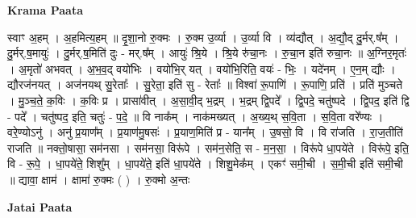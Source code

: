 \documentclass[17pt]{extarticle}
\begin{document}
\textbf{Krama Paata} \newline

स्वाꣳ अ॒हम् । अ॒हमित्य॒हम् ॥ दृ॒शा॒नो रु॒क्मः । रु॒क्म उ॒र्व्या । उ॒र्व्या वि । व्य॑द्यौत् । अ॒द्यौ॒द् दु॒र्मर्.ष᳚म् । दु॒र्मर्.ष॒मायुः॑ । दु॒र्मर्.ष॒मिति॑ दुः - मर्.ष᳚म् । आयुः॑ श्रि॒ये । श्रि॒ये रु॑चा॒नः । रु॒चा॒न इति॑ रुचा॒नः ॥ अ॒ग्निर॒मृतः॑ । अ॒मृतो॑ अभवत् । अ॒भ॒व॒द् वयो॑भिः । वयो॑भि॒र् यत् । वयो॑भि॒रिति॒ वयः॑ - भिः॒ । यदे॑नम् । ए॒न॒म् द्यौः । द्यौरज॑नयत् । अज॑नयथ् सु॒रेताः᳚ । सु॒रेता॒ इति॑ सु - रेताः᳚ ॥ विश्वा॑ रू॒पाणि॑ । रू॒पाणि॒ प्रति॑ । प्रति॑ मुञ्चते । मु॒ञ्च॒ते॒ क॒विः । क॒विः प्र । प्रासा॑वीत् । अ॒सा॒वी॒द् भ॒द्रम् । भ॒द्रम् द्वि॒पदे᳚ । द्वि॒पदे॒ चतु॑ष्पदे । द्वि॒पद॒ इति॑ द्वि - पदे᳚ । चतु॑ष्पद॒ इति॒ चतुः॑ - प॒दे॒ ॥ वि नाक᳚म् । नाक॑मख्यत् । अ॒ख्य॒थ् स॒वि॒ता । स॒वि॒ता वरे᳚ण्यः । वरे॒ण्योऽनु॑ । अनु॑ प्र॒याण᳚म् । प्र॒याण॑मु॒षसः॑ । प्र॒याण॒मिति॑ प्र - यान᳚म् । उ॒षसो॒ वि । वि रा॑जति । रा॒ज॒तीति॑ राजति ॥ नक्तो॒षासा॒ सम॑नसा । सम॑नसा॒ विरू॑पे । सम॑न॒सेति॒ स - म॒न॒सा॒ । विरू॑पे धा॒पये॑ते । विरू॑पे॒ इति॒ वि - रू॒पे॒ । धा॒पये॑ते॒ शिशु᳚म् । धा॒पये॑ते॒ इति॑ धा॒पये॑ते । शिशु॒मेक᳚म् । एकꣳ॑ समी॒ची । स॒मी॒ची इति॑ समी॒ची ॥ द्यावा॒ क्षाम॑ । क्षामा॑ रु॒क्मः ( ) । रु॒क्मो अ॒न्तः \newline

\textbf{Jatai Paata} \newline
\end{document}
